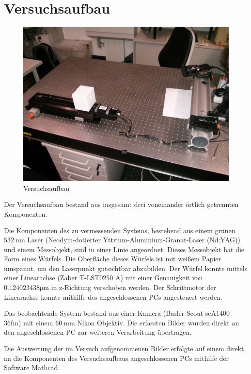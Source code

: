 \section{Versuchsaufbau}

\begin{figure}[h!]
	\centering
	\includegraphics[width=0.8\linewidth]{img/versuchsaufbaufoto.jpg}
	\caption{Versuchsaufbau}
	\label{fig:Versuchsaufbau}
\end{figure}

Der Versuchsaufbau bestand aus insgesamt drei voneinander örtlich getrennten Komponenten. 

Die Komponenten des zu vermessenden Systems, bestehend aus einem grünen $\SI{532}{\nm}$ Laser (Neodym-dotierter Yttrium-Aluminium-Granat-Laser (Nd:YAG)) und einem Messobjekt, sind in einer Linie angeordnet. Dieses Messobjekt hat die Form eines Würfels. Die Oberfläche dieses Würfels ist mit weißem Papier umspannt, um den Laserpunkt gutsichtbar abzubilden. Der Würfel konnte mittels einer Linearachse (Zaber T-LST0250 A) mit einer Genauigkeit von $0.124023438 \si{\micro\meter}$ in z-Richtung verschoben werden. Der Schrittmotor der Linearachse konnte mithilfe des angeschlossenen PCs angesteuert werden.

Das beobachtende System bestand aus einer Kamera (Basler Scout scA1400-36fm) mit einem $\SI{60}{\mm}$ Nikon Objektiv. Die erfassten Bilder wurden direkt an den angeschlossenen PC zur weiteren Verarbeitung übertragen.

Die Auswertung der im Versuch aufgenommenen Bilder erfolgte auf einem direkt an die Komponenten des Versuchsaufbaus angeschlossenen PCs mithilfe der Software Mathcad.